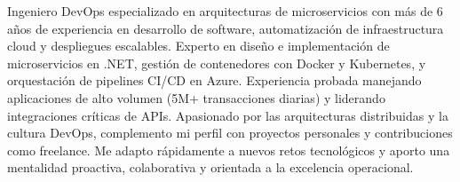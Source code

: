 

\begin{cvparagraph}

Ingeniero DevOps especializado en arquitecturas de microservicios con más de 6 años de experiencia en desarrollo de software, automatización de infraestructura cloud y despliegues escalables. Experto en diseño e implementación de microservicios en .NET, gestión de contenedores con Docker y Kubernetes, y orquestación de pipelines CI/CD en Azure. Experiencia probada manejando aplicaciones de alto volumen (5M+ transacciones diarias) y liderando integraciones críticas de APIs. Apasionado por las arquitecturas distribuidas y la cultura DevOps, complemento mi perfil con proyectos personales y contribuciones como freelance. Me adapto rápidamente a nuevos retos tecnológicos y aporto una mentalidad proactiva, colaborativa y orientada a la excelencia operacional.
\end{cvparagraph}